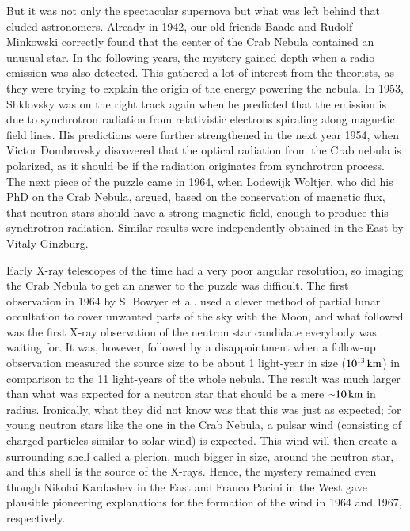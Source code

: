 But it was not only the spectacular supernova but what was left behind that eluded astronomers.
Already in 1942, our old friends Baade and Rudolf Minkowski correctly found that the center of the Crab Nebula contained an unusual star.\cite{Baade42, Minkowski42}
In the following years, the mystery gained depth when a radio emission was also detected.\cite{BSS49}
This gathered a lot of interest from the theorists, as they were trying to explain the origin of the energy powering the nebula.
In 1953, Shklovsky was on the right track again when he predicted that the emission is due to synchrotron radiation from relativistic electrons spiraling along magnetic field lines. 
His predictions were further strengthened in the next year 1954, when Victor Dombrovsky discovered that the optical radiation from the Crab nebula is polarized,\cite{Dombrovsky54} as it should be if the radiation originates from synchrotron process.
The next piece of the puzzle came in 1964, when Lodewijk Woltjer, who did his PhD on the Crab Nebula, argued, based on the conservation of magnetic flux, that neutron stars should have a strong magnetic field, enough to produce this synchrotron radiation.\cite{Woltjer64}
Similar results were independently obtained in the East by Vitaly Ginzburg.\cite{Ginzburg64}


Early X-ray telescopes of the time had a very poor angular resolution, so imaging the Crab Nebula to get an answer to the puzzle was difficult.
The first observation in 1964 by S. Bowyer et al. used a clever method of partial lunar occultation to cover unwanted parts of the sky with the Moon, and what followed was the first X-ray observation of the neutron star candidate everybody was waiting for.\cite{BBC64a}
It was, however, followed by a disappointment when a follow-up observation measured the source size to be about 1 light-year in size ($10^{13}\, \mathrm{km}$) in comparison to the 11 light-years of the whole nebula.\cite{BBC64b}
The result was much larger than what was expected for a neutron star that should be a mere $\mathord{\sim} 10\, \mathrm{km}$ in radius.
Ironically, what they did not know was that this was just as expected;
for young neutron stars like the one in the Crab Nebula, a pulsar wind (consisting of charged particles similar to solar wind) is expected. 
This wind will then create a surrounding shell called a plerion, much bigger in size, around the neutron star, and this shell is the source of the X-rays.
Hence, the mystery remained even though Nikolai Kardashev in the East and Franco Pacini in the West gave plausible pioneering explanations for the formation of the wind in 1964 and 1967, respectively.\cite{Kardashev64, Pacini67}


